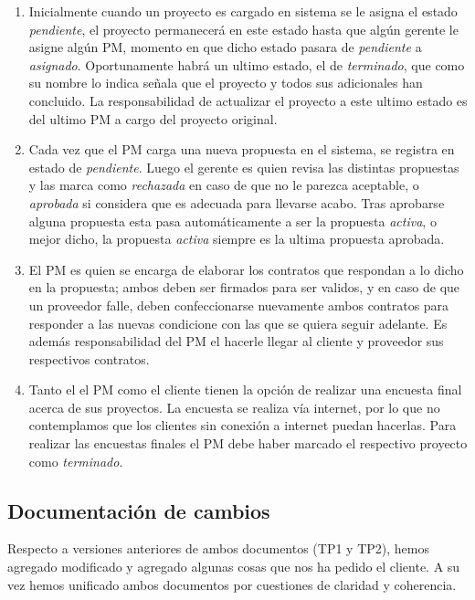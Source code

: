 \documentclass{article}
\theoremstyle{definition}
\theoremstyle{remark}
\begin{document}
\begin{enumerate}
    \item Inicialmente cuando un proyecto es cargado en sistema se le asigna el estado \textit{pendiente}, el proyecto permanecerá en este estado hasta que algún gerente le asigne algún PM, momento en que dicho estado pasara de \textit{pendiente} a \textit{asignado}. Oportunamente habrá un ultimo estado, el de \textit{terminado}, que como su nombre lo indica señala que el proyecto y todos sus adicionales han concluido. La responsabilidad de actualizar el proyecto a este ultimo estado es del ultimo PM a cargo del proyecto original.
    
    \item Cada vez que el PM carga una nueva propuesta en el sistema, se registra en estado de \textit{pendiente}. Luego el gerente es quien revisa las distintas propuestas y las marca como \textit{rechazada} en caso de que no le parezca aceptable, o \textit{aprobada} si considera que es adecuada para llevarse acabo. Tras aprobarse alguna propuesta esta pasa automáticamente a ser la propuesta \textit{activa}, o mejor dicho, la propuesta \textit{activa} siempre es la ultima propuesta aprobada.
    
    \item El PM es quien se encarga de elaborar los contratos que respondan a lo dicho en la propuesta; ambos deben ser firmados para ser validos, y en caso de que un proveedor falle, deben confeccionarse nuevamente ambos contratos para responder a las nuevas condicione con las que se quiera seguir adelante. Es además responsabilidad del PM el hacerle llegar al cliente y proveedor sus respectivos contratos.
    
    \item Tanto el el PM como el cliente tienen la opción de realizar una encuesta final acerca de sus proyectos. La encuesta se realiza vía internet, por lo que no contemplamos que los clientes sin conexión a internet puedan hacerlas. Para realizar las encuestas finales el PM debe haber marcado el respectivo proyecto como \textit{terminado}. 


\end{enumerate}

\subsection{Documentación de cambios}
Respecto a versiones anteriores de ambos documentos (TP1 y TP2), hemos agregado modificado y agregado algunas cosas que nos ha pedido el cliente. A su vez hemos unificado ambos documentos por cuestiones de claridad y coherencia.
\end{document}
